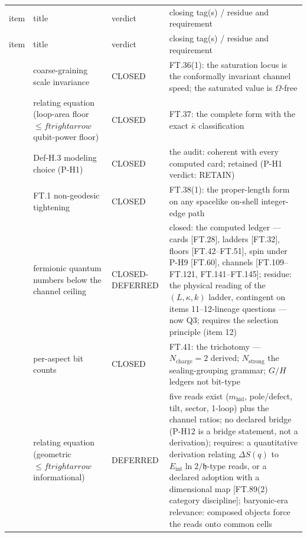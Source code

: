 \documentclass[11pt,openany]{report}
\theoremstyle{canonplain}
\theoremstyle{canondef}
\begin{document}
{\scriptsize\setlength{\tabcolsep}{4pt}
\begin{longtable}{>{\raggedright\arraybackslash}p{}|>{\raggedright\arraybackslash}p{}|>{\raggedright\arraybackslash}p{}|>{\raggedright\arraybackslash}p{}}
\toprule
item & title & verdict & closing tag(s) / residue and requirement \\
\addlinespace[2pt]
\midrule
\endfirsthead
\toprule
item & title & verdict & closing tag(s) / residue and requirement \\
\addlinespace[2pt]
\midrule
\endhead
\bottomrule
\endlastfoot
1 & coarse-graining scale invariance & CLOSED & FT.36(1): the saturation locus is the conformally invariant channel speed; the saturated value is $\Omega$-free \\
2 & relating equation (loop-area floor $\le\allowbreak ftrightarrow$ qubit-power floor) & CLOSED & FT.37: the complete form with the exact $\bar\kappa$ classification \\
3 & Def-H.3 modeling choice (P-H1) & CLOSED & the audit: coherent with every computed card; retained (P-H1 verdict: RETAIN) \\
4 & FT.1 non-geodesic tightening & CLOSED & FT.38(1): the proper-length form on any spacelike on-shell integer-edge path \\
5 & fermionic quantum numbers below the channel ceiling & CLOSED-DEFERRED & closed: the computed ledger — cards [FT.28], ladders [FT.32], floors [FT.42–FT.51], spin under P-H9 [FT.60], channels [FT.109–FT.121, FT.141–FT.145]; residue: the physical reading of the $(L,\allowbreak \kappa,\allowbreak k)$ ladder, contingent on items 11–12-lineage questions — now Q3; requires the selection principle (item 12) \\
6 & per-aspect bit counts & CLOSED & FT.41: the trichotomy — $N_{\mathrm{charge}}=\allowbreak 2$ derived; $N_{\mathrm{strong}}$ the sealing-grouping grammar; $G/H$ ledgers not bit-type \\
7 & relating equation (geometric $\le\allowbreak ftrightarrow$ informational) & DEFERRED & five reads exist ($m_{\mathrm{hid}}$, pole/defect, tilt, sector, 1-loop) plus the channel ratios; no declared bridge (P-H12 is a bridge statement, not a derivation); requires: a quantitative derivation relating $\Delta S(q)$ to $E_{\mathrm{int}}\ln2/\mathfrak h$-type reads, or a declared adoption with a dimensional map [FT.89(2) category discipline]; baryonic-era relevance: composed objects force the reads onto common cells \\

\end{longtable}}
\end{document}
